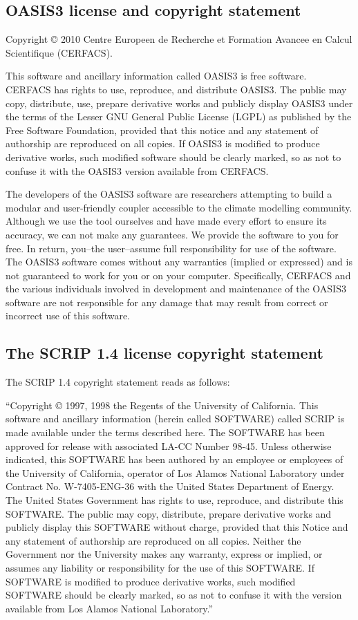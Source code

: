 \subsection{OASIS3 license and copyright statement}

Copyright © 2010 Centre Europeen de Recherche et Formation
Avancee en Calcul Scientifique (CERFACS).  

This software and ancillary information called OASIS3 is free
software.  CERFACS has rights to use, reproduce, and distribute
OASIS3. The public may copy, distribute, use, prepare derivative works and
publicly display OASIS3 under the terms of the Lesser GNU General
Public License (LGPL) as published by the Free Software Foundation,
provided that this notice and any statement of authorship are
reproduced on all copies. If OASIS3 is modified to produce derivative
works, such modified software should be clearly marked, so as not to
confuse it with the OASIS3 version available from CERFACS.

The developers of the OASIS3 software are researchers attempting to
build a modular and user-friendly coupler accessible to the climate
modelling community. Although we use the tool ourselves and have made
every effort to ensure its accuracy, we can not make any
guarantees. We provide the software to you for free. In return,
you--the user--assume full responsibility for use of the software. The
OASIS3 software comes without any warranties (implied or expressed) and
is not guaranteed to work for you or on your computer. Specifically,
CERFACS and the various individuals involved in development and
maintenance of the OASIS3 software are not responsible for any damage
that may result from correct or incorrect use of this software.

\subsection{The SCRIP 1.4 license copyright statement}
\label{sec_SCRIP}

The SCRIP 1.4 copyright statement reads as follows:

 ``Copyright © 1997, 1998 the Regents of the
University of California.  This software and ancillary information
(herein called SOFTWARE) called SCRIP is made available under the
terms described here. The SOFTWARE has been approved for release with
associated LA-CC Number 98-45. Unless otherwise indicated, this
SOFTWARE has been authored by an employee or employees of the
University of California, operator of Los Alamos National Laboratory
under Contract No. W-7405-ENG-36 with the United States Department of
Energy. The United States Government has rights to use, reproduce, and
distribute this SOFTWARE. The public may copy, distribute, prepare
derivative works and publicly display this SOFTWARE without charge,
provided that this Notice and any statement of authorship are
reproduced on all copies. Neither the Government nor the University
makes any warranty, express or implied, or assumes any liability or
responsibility for the use of this SOFTWARE. If SOFTWARE is modified
to produce derivative works, such modified SOFTWARE should be clearly
marked, so as not to confuse it with the version available from Los
Alamos National Laboratory.''
